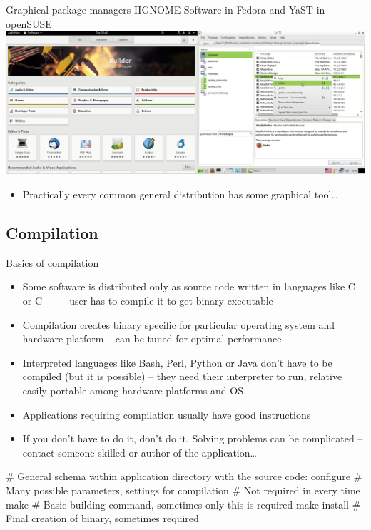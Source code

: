 \documentclass[compress, ucs, xelatex, 11pt, xcolor=svgnames,
  hyperref={
    bookmarks=true,
    unicode=true,
    colorlinks=true,
    pdftitle={Linux, command line and MetaCentrum},
    plainpages=false,
    pdfauthor={Vojtech Zeisek},
    pdfsubject={Course about use of Linux command line, writing shell scripts and using MetaCentrum of CESNET},
    pdfcreator={XeLaTeX},
    pdfkeywords={Linux, GNU, BASH, shell, command line, MetaCentrum},
    linkcolor=DarkRed,
    anchorcolor=DarkBlue,
    citecolor=Indigo,
    filecolor=NavyBlue,
    menucolor=DarkMagenta,
    urlcolor=DarkBlue,
    pdftex},
  url={hyphens, lowtilde} %
  ]{beamer}
\begin{document}
\begin{frame}{Graphical package managers II}{GNOME Software in Fedora and YaST in openSUSE}
  \includegraphics[width=\textwidth]{software_managers_fedora_suse.png}
  \begin{itemize}
    \item Practically every common general distribution has some graphical tool\ldots
  \end{itemize}
\end{frame}

\subsection{Compilation}

\begin{frame}[fragile]{Basics of compilation}
  \begin{itemize}
    \item Some software is distributed only as source code written in languages like C or C++ -- user has to compile it to get binary executable
    \item Compilation creates binary specific for particular operating system and hardware platform -- can be tuned for optimal performance
    \item Interpreted languages like Bash, Perl, Python or Java don't have to be compiled (but it is possible) -- they need their interpreter to run, relative easily portable among hardware platforms and OS
    \item Applications requiring compilation usually have good instructions
    \item If you don't have to do it, don't do it. Solving problems can be complicated -- contact someone skilled or author of the application\ldots
  \end{itemize}
  \begin{bashcode}
    # General schema within application directory with the source code:
    configure # Many possible parameters, settings for compilation
              # Not required in every time
    make # Basic building command, sometimes only this is required
    make install # Final creation of binary, sometimes required
  \end{bashcode}
\end{frame}
\end{document}
